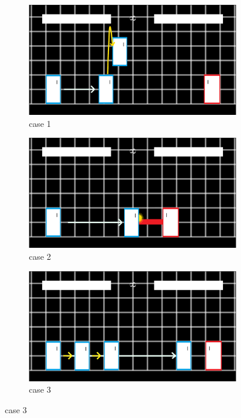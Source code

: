 \begin{figure}[h]
	\centering
	\begin{subfigure}[h]{0.3\textwidth}
		\centering
		\includegraphics[width=\textwidth]{Figures/Example1.png}
		\caption{case 1}
		\label{}
	\end{subfigure}
	\begin{subfigure}[h]{0.3\textwidth}
		\centering
		\includegraphics[width=\textwidth]{Figures/Example2.png}
		\caption{case 2}
		\label{}
	\end{subfigure}
	\begin{subfigure}[h]{0.3\textwidth}
		\centering
		\includegraphics[width=\textwidth]{Figures/Example3.png}
		\caption{case 3}
		\label{}
	\end{subfigure}
\end{figure}

